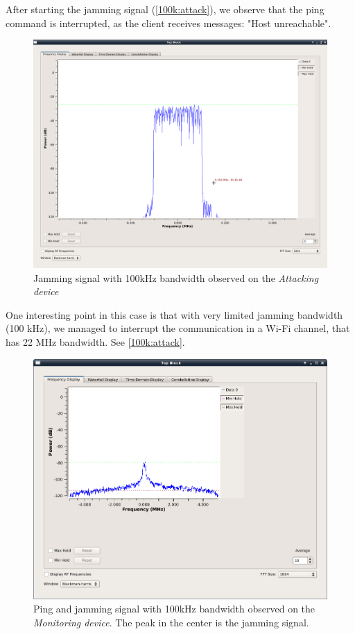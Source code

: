 \documentclass[12pt,a4paper]{article}
\begin{document}
	After starting the jamming signal (\autoref{100k:attack}), we observe that the ping command is interrupted, as the client receives messages: "Host unreachable".
	\begin{figure}
		\includegraphics[width=\textwidth]{images/attack_100kHz.png}
		\caption{Jamming signal with 100kHz bandwidth observed on the \emph{Attacking device}}
		\label{100k:attack}
	\end{figure}
	One interesting point in this case is that with very limited jamming bandwidth (100 kHz), we managed to interrupt the communication in a Wi-Fi channel, that has 22 MHz bandwidth. See \autoref{100k:attack}.
	\begin{figure}
		\includegraphics[width=\textwidth]{images/mon_100k.png}
		\caption{Ping and jamming signal with 100kHz bandwidth observed on the \emph{Monitoring device}. The peak in the center is the jamming signal.}
		\label{100k:attack}
	\end{figure}
	
\end{document}
